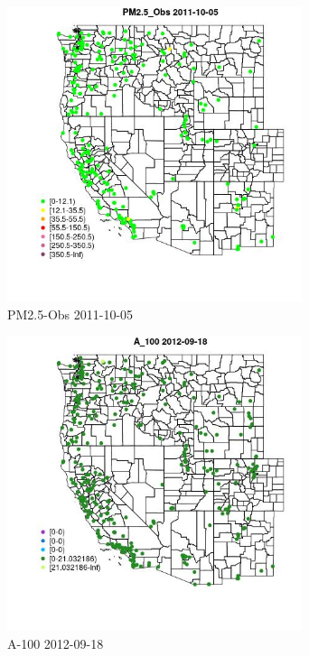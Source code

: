 \begin{figure} 
\centering  
\includegraphics[width=0.77\textwidth]{Code_Outputs/ML_input_report_ML_input_PM25_Step5_part_d_de_duplicated_aves_ML_input_MapObsPM25_Obs2011-10-05.jpg} 
\caption{\label{fig:ML_input_report_ML_input_PM25_Step5_part_d_de_duplicated_aves_ML_inputMapObsPM25_Obs2011-10-05}PM2.5-Obs 2011-10-05} 
\end{figure} 
 

\begin{figure} 
\centering  
\includegraphics[width=0.77\textwidth]{Code_Outputs/ML_input_report_ML_input_PM25_Step5_part_d_de_duplicated_aves_ML_input_MapObsA_1002012-09-18.jpg} 
\caption{\label{fig:ML_input_report_ML_input_PM25_Step5_part_d_de_duplicated_aves_ML_inputMapObsA_1002012-09-18}A-100 2012-09-18} 
\end{figure} 
 

